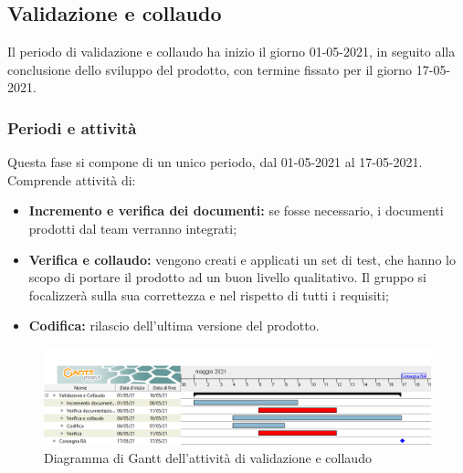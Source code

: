 \subsection{Validazione e collaudo}
Il periodo di validazione e collaudo ha inizio il giorno 01-05-2021, in seguito alla conclusione dello sviluppo del prodotto, con termine fissato per il giorno 17-05-2021.
\subsubsection{Periodi e attività}
Questa fase si compone di un unico periodo, dal 01-05-2021 al 17-05-2021. Comprende attività di:
\begin{itemize}
	\item \textbf{Incremento e verifica dei documenti:} se fosse necessario, i documenti prodotti dal team verranno integrati;
	\item \textbf{Verifica e collaudo:} vengono creati e applicati un set di test, che hanno lo scopo di portare il prodotto ad un buon livello qualitativo. Il gruppo si focalizzerà sulla sua correttezza e nel rispetto di tutti i requisiti;
	\item \textbf{Codifica:} rilascio dell'ultima versione del prodotto.
\end{itemize}
\begin{figure}[h]
	\centering
	\includegraphics[width=\linewidth]{Images/GanttPianificazioneValidazioneCollaudo.PNG}
	\caption{Diagramma di Gantt dell'attività di validazione e collaudo}
\end{figure}


